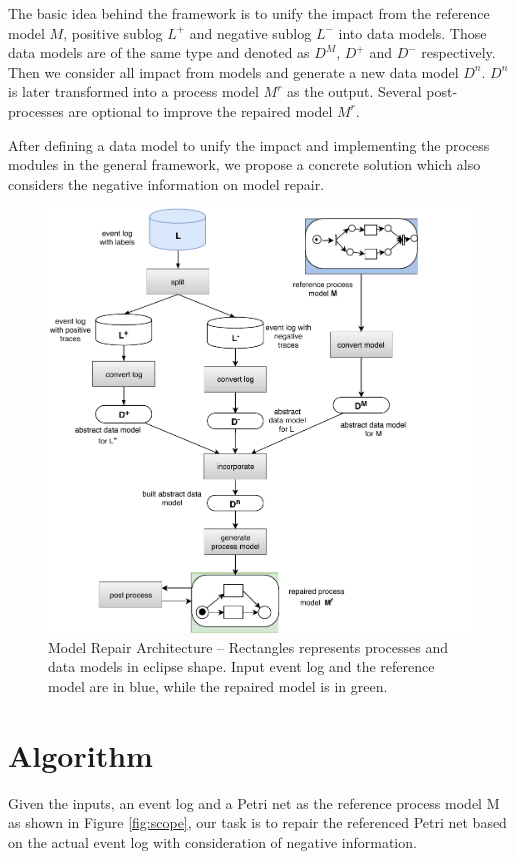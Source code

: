 The basic idea behind the framework is to unify the impact from the reference model $M$, positive sublog $L^+$ and negative sublog $L^-$ into data models. Those data models are of the same type and denoted as $D^M$, $D^+$ and $D^-$ respectively. Then we consider all impact from models and generate a new data model $D^n$. $D^n$ is later transformed into a process model $M^r$ as the output. Several post-processes are optional to improve the repaired model $M^r$.

After defining a data model to unify the impact and implementing the process modules in the general framework, we propose a concrete solution which also considers the negative information on model repair. 
\begin{figure}
	\includegraphics{figures/algorithm/FD_framework.pdf}
	\caption[Model Repair Architecture]{Model Repair Architecture -- \small Rectangles represents processes and data models in eclipse shape. Input event log and the reference model are in blue, while the repaired model is in green.}
	\label{fig:framework}
\end{figure} 
\section{Algorithm}
Given the inputs, an event log and a Petri net as the reference process model M as shown in Figure \ref{fig:scope}, our task is to repair the referenced Petri net based on the actual event log with consideration of negative information. 

